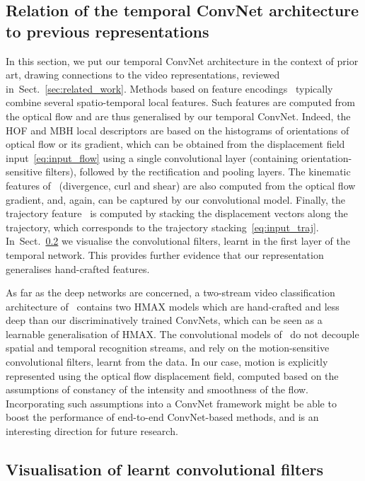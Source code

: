 \documentclass{article} \usepackage{nips14submit_e,times}
\newcommand{\sref}[1]{Sect.~\ref{#1}}
\begin{document}
\subsection{Relation of the temporal ConvNet architecture to previous representations}
\label{sec:rel}

In this section, we put our temporal ConvNet architecture in the
context of prior art, drawing connections to the video
representations, reviewed in~\sref{sec:related_work}.  Methods based
on feature encodings~\cite{Laptev08,Wang11b} typically combine several
spatio-temporal local features. Such features are computed from the
optical flow and are thus generalised by our temporal ConvNet.
Indeed, the HOF and MBH local descriptors are based on the
histograms of orientations of optical flow or its gradient, which can be obtained from
the displacement field input~\eqref{eq:input_flow} using a single
convolutional layer (containing orientation-sensitive filters),
followed by the rectification and pooling layers. 
The kinematic features of~\cite{Jain13} (divergence, curl and shear)
are also computed from the optical flow gradient, and, again, can be captured
by our convolutional model.  Finally, the trajectory
feature~\cite{Wang11b} is computed by stacking the displacement
vectors along the trajectory, which corresponds to the
trajectory stacking~\eqref{eq:input_traj}.  
In~\sref{sec:vis_conv} we visualise the convolutional filters, learnt in the first layer of the temporal network. 
This provides further evidence that our representation generalises hand-crafted features.


As far as the deep networks are concerned, a two-stream video classification architecture of~\cite{Kuehne11} contains two HMAX models which are hand-crafted and less deep than our
discriminatively trained ConvNets, which can be seen as a learnable generalisation of HMAX. The convolutional models of~\cite{Ji13,Karpathy14} do not decouple spatial and temporal
recognition streams, and rely on the motion-sensitive convolutional filters, learnt from the data. In our case, motion is explicitly represented using the optical flow displacement
field, computed based on the assumptions of constancy of the intensity and smoothness of the flow. Incorporating such assumptions into a ConvNet framework might be able to boost the 
performance of end-to-end ConvNet-based methods, and is an interesting direction for future research.

\subsection{Visualisation of learnt convolutional filters}
\label{sec:vis_conv}
\end{document}
